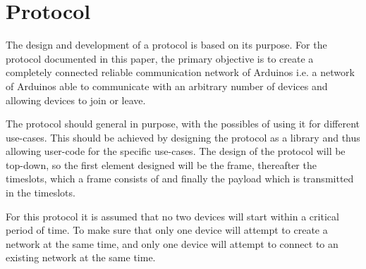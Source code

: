 \section{Protocol}
The design and development of a protocol is based on its purpose.
For the protocol documented in this paper, the primary objective is to create a completely connected reliable communication network of Arduinos i.e. a network of Arduinos able to communicate with an arbitrary number of devices and allowing devices to join or leave.

The protocol should general in purpose, with the possibles of using it for different use-cases.
This should be achieved by designing the protocol as a library and thus allowing user-code for the specific use-cases.
The design of the protocol will be top-down, so the first element designed will be the frame, thereafter the timeslots, which a frame consists of and finally the payload which is transmitted in the timeslots. 

For this protocol it is assumed that no two devices will start within a critical period of time.
To make sure that only one device will attempt to create a network at the same time, and only one device will attempt to connect to an existing network at the same time. 
